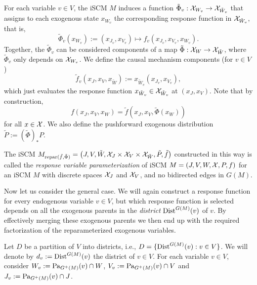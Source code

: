 For each variable $v \in V$, the iSCM $M$ induces a function $\tilde\Phi_v : \mathcal{X}_{W_v} \to \mathcal{X}_{\tilde{W}_v}$ that assigns to each exogenous state $x_{W_v}$ the corresponding response function in $\mathcal{X}_{\tilde{W}_v}$, that is,
$$\tilde\Phi_v(x_{W_v}) := (x_{J_v},x_{V_v}) \mapsto f_v(x_{J_v},x_{V_v},x_{W_v}).$$
Together, the $\tilde\Phi_v$ can be considered components of a map $\tilde\Phi : \mathcal{X}_W \to \mathcal{X}_{\tilde{W}}$, where $\tilde\Phi_v$ only depends on $\mathcal{X}_{W_v}$.
We define the causal mechanism components (for $v \in V$)
$$\tilde{f}_v(x_J,x_V,x_{\tilde{W}}) := x_{\tilde{W}_v}(x_{J_v},x_{V_v}),$$
which just evaluates the response function $x_{\tilde{W}_v} \in \mathcal{X}_{\tilde{W}_v}$ at $(x_J,x_V)$. 
Note that by construction,
  $$f(x_J,x_V,x_W) = \tilde{f}(x_J,x_V,\tilde{\Phi}(x_W))$$
for all $x \in \mathcal{X}$.
We also define the pushforward exogenous distribution $\tilde{P} := (\tilde\Phi)_* P$.
\begin{Def}
The iSCM $M_{\mathrm{repar}({\tilde{f}},{\tilde\Phi})} = \left ( J, V, \tilde{W}, \mathcal{X}_J \times \mathcal{X}_V \times \mathcal{X}_{\tilde{W}}, \tilde{P}, \tilde{f} \right )$
constructed in this way is called the \emph{response variable parameterization} of iSCM $M = \left ( J, V, W, \mathcal{X}, P, f \right )$
for an iSCM $M$ with discrete spaces $\mathcal{X}_J$ and $\mathcal{X}_V$, and no bidirected edges in $G(M)$.
\end{Def}

Now let us consider the general case. 
We will again construct a response function for every endogenous variable $v \in V$, but which response function is selected depends on all the exogenous parents in the \emph{district} $\mathrm{Dist}^{G(M)}(v)$ of $v$.
By effectively merging these exogenous parents we then end up with the required factorization of the reparameterized exogenous variables.

Let $D$ be a partition of $V$ into districts, i.e., $D = \{ \mathrm{Dist}^{G(M)}(v) : v \in V\}$.
We will denote by $d_v := \mathrm{Dist}^{G(M)}(v)$ the district of $v \in V$.
For each variable $v \in V$, consider $W_v := \mathrm{Pa}_{G^+(M)}(v) \cap W$, $V_v := \mathrm{Pa}_{G^+(M)}(v) \cap V$ and $J_v := \mathrm{Pa}_{G^+(M)}(v) \cap J$.

